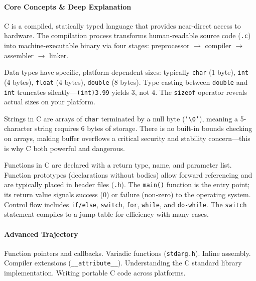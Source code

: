 \documentclass[11pt, a4paper, oneside]{report}
\newcommand{\arrow}{$\rightarrow$}
\begin{document}
\paragraph{Core Concepts \& Deep Explanation} C is a compiled, statically typed language that provides near-direct access to hardware. The compilation process transforms human-readable source code (\texttt{.c}) into machine-executable binary via four stages: preprocessor \arrow{} compiler \arrow{} assembler \arrow{} linker.

Data types have specific, platform-dependent sizes: typically \texttt{char} (1 byte), \texttt{int} (4 bytes), \texttt{float} (4 bytes), \texttt{double} (8 bytes). Type casting between \texttt{double} and \texttt{int} truncates silently---\texttt{(int)3.99} yields 3, not 4. The \texttt{sizeof} operator reveals actual sizes on your platform.

Strings in C are arrays of \texttt{char} terminated by a null byte (\texttt{'\textbackslash 0'}), meaning a 5-character string requires 6 bytes of storage. There is no built-in bounds checking on arrays, making buffer overflows a critical security and stability concern---this is why C both powerful and dangerous.

Functions in C are declared with a return type, name, and parameter list. Function prototypes (declarations without bodies) allow forward referencing and are typically placed in header files (\texttt{.h}). The \texttt{main()} function is the entry point; its return value signals success (0) or failure (non-zero) to the operating system. Control flow includes \texttt{if/else}, \texttt{switch}, \texttt{for}, \texttt{while}, and \texttt{do-while}. The \texttt{switch} statement compiles to a jump table for efficiency with many cases.

\paragraph{Advanced Trajectory} Function pointers and callbacks. Variadic functions (\texttt{stdarg.h}). Inline assembly. Compiler extensions (\texttt{\_\_attribute\_\_}). Understanding the C standard library implementation. Writing portable C code across platforms.
\end{document}
